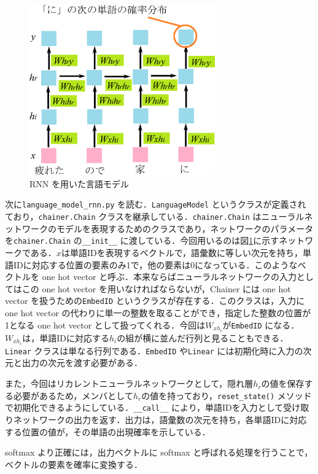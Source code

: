   \begin{figure}[htb]
   \centering
   \includegraphics[width=80mm]{images/TsuruokaLab/langmodel.eps}
   \caption{RNN を用いた言語モデル}
   \label{fig:langmodel}
  \end{figure}

次に\verb+language_model_rnn.py+ を読む．\verb+LanguageModel+ というクラスが定義されており，\verb+chainer.Chain+ クラスを継承している．\verb+chainer.Chain+ はニューラルネットワークのモデルを表現するためのクラスであり，ネットワークのパラメータを\verb+chainer.Chain+ の\verb+__init__+ に渡している．今回用いるのは図\ref{fig:langmodel}に示すネットワークである．$x$は単語IDを表現するベクトルで，語彙数に等しい次元を持ち，単語IDに対応する位置の要素のみ1で，他の要素は0になっている．このようなベクトルを one hot vector と呼ぶ．本来ならばニューラルネットワークの入力としてはこの one hot vector を用いなければならないが，Chainer には one hot vector を扱うための\verb+EmbedID+ というクラスが存在する．このクラスは，入力に one hot vector の代わりに単一の整数を取ることができ，指定した整数の位置が1となる one hot vector として扱ってくれる．今回は$W_{xh_i}$が\verb+EmbedID+ になる．$W_{xh_i}$は，単語IDに対応する$h_i$の組が横に並んだ行列と見ることもできる．\verb+Linear+ クラスは単なる行列である．\verb+EmbedID+ や\verb+Linear+ には初期化時に入力の次元と出力の次元を渡す必要がある．

また，今回はリカレントニューラルネットワークとして，隠れ層$h_r$の値を保存する必要があるため，メンバとして$h_r$の値を持っており，\verb+reset_state()+ メソッドで初期化できるようにしている．\verb+__call__+ により，単語IDを入力として受け取りネットワークの出力を返す．出力は，語彙数の次元を持ち，各単語IDに対応する位置の値が，その単語の出現確率を示している．
\begin{itembox}[l]{softmax}
より正確には，出力ベクトルに softmax と呼ばれる処理を行うことで，ベクトルの要素を確率に変換する．
\end{itembox}



